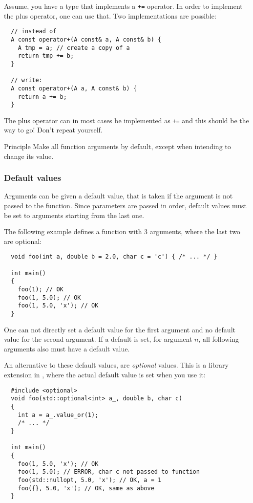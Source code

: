 \begin{example}
  Assume, you have a type  that implements a \texttt{+=} operator. In order to implement the plus operator, one can use that. Two implementations
  are possible:
  \begin{verbatim}
  // instead of
  A const operator+(A const& a, A const& b) {
    A tmp = a; // create a copy of a
    return tmp += b;
  }

  // write:
  A const operator+(A a, A const& b) {
    return a += b;
  }
  \end{verbatim}
  The plus operator can in most cases be implemented as \texttt{+=} and this should be the way to go! Don't repeat yourself.
\end{example}

\begin{guideline}{Principle}
  Make all function arguments  by default, except when intending to change its value.
\end{guideline}

\subsubsection{Default values}
Arguments can be given a default value, that is taken if the argument is not passed to the function. Since parameters are passed in order, default values
must be set to arguments starting from the last one.
\begin{example}
  The following example defines a function with 3 arguments, where the last two are optional:
  \begin{verbatim}
  void foo(int a, double b = 2.0, char c = 'c') { /* ... */ }

  int main()
  {
    foo(1); // OK
    foo(1, 5.0); // OK
    foo(1, 5.0, 'x'); // OK
  }
  \end{verbatim}
\end{example}

\begin{rem}
  One can not directly set a default value for the first argument and no default value for the second argument. If a default is set, for argument $n$, all
  following arguments also must have a default value.

  An alternative to these default values, are \emph{optional} values. This is a library extension in \marginpar{[\cxx{17}]}, where the actual default
  value is set when you use it:
  \begin{verbatim}
  #include <optional>
  void foo(std::optional<int> a_, double b, char c)
  {
    int a = a_.value_or(1);
    /* ... */
  }

  int main()
  {
    foo(1, 5.0, 'x'); // OK
    foo(1, 5.0); // ERROR, char c not passed to function
    foo(std::nullopt, 5.0, 'x'); // OK, a = 1
    foo({}, 5.0, 'x'); // OK, same as above
  }
  \end{verbatim}
\end{rem}



